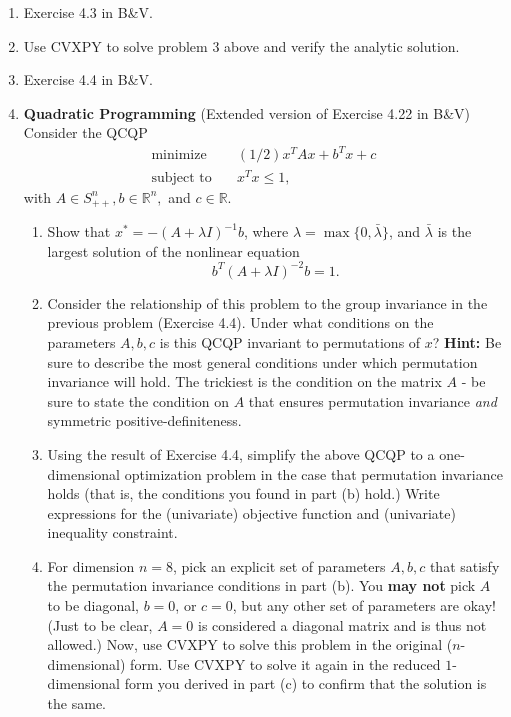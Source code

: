 \documentclass[11pt]{article}
\begin{document}
\begin{enumerate}
\begin{enumerate}
  \item Solve the modified problem using CVXPY for the same distances given in
    part (c), and verify that the answer matches your analytic solution.
  \end{enumerate}

\item Exercise 4.3 in B\&V.

\item Use CVXPY to solve problem 3 above and verify the analytic solution.

\item Exercise 4.4 in B\&V.
  
\item {\bf Quadratic Programming} (Extended version of Exercise 4.22 in B\&V)
  Consider the QCQP
\begin{align*}
\text{minimize} \quad & (1/2)x^T A x + b^Tx + c\\
\text{subject to} \quad & x^T x \leq 1,
\end{align*}
with $A \in S_{++}^n, b \in \mathbb{R}^n,$ and $c \in \mathbb{R}$.
\begin{enumerate}
\item Show that $x^* = -(A + \lambda I)^{-1} b$, where $\lambda = \max\{0,
  \bar{\lambda}\}$, and $\bar{\lambda}$ is the largest solution of the nonlinear
  equation
  $$b^T (A + \lambda I)^{-2} b = 1.$$

\item Consider the relationship of this problem to the group invariance in the
  previous problem (Exercise 4.4). Under what conditions on the parameters
  $A, b, c$ is this QCQP invariant to permutations of $x$? {\bf Hint:} Be sure
  to describe the most general conditions under which permutation invariance
  will hold. The trickiest is the condition on the matrix $A$ - be sure to state
  the condition on $A$ that ensures permutation invariance {\em and} symmetric
  positive-definiteness.

\item Using the result of Exercise 4.4, simplify the above QCQP to a
  one-dimensional optimization problem in the case that permutation invariance
  holds (that is, the conditions you found in part (b) hold.) Write expressions
  for the (univariate) objective function and (univariate) inequality
  constraint.

\item For dimension $n = 8$, pick an explicit set of parameters $A, b, c$ that
  satisfy the permutation invariance conditions in part (b). You {\bf may not}
  pick $A$ to be diagonal, $b = 0$, or $c = 0$, but any other set of parameters
  are okay! (Just to be clear, $A = 0$ is considered a diagonal matrix and is
  thus not allowed.) Now, use CVXPY to solve this problem in the original
  ($n$-dimensional) form. Use CVXPY to solve it again in the reduced
  $1$-dimensional form you derived in part (c) to confirm that the solution is
  the same.
\end{enumerate}

\end{enumerate}
\end{document}
